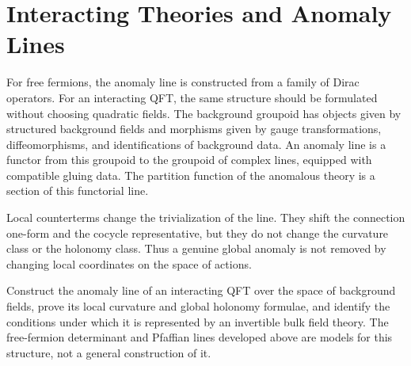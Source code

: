 \section{Interacting Theories and Anomaly Lines}

For free fermions, the anomaly line is constructed from a family of Dirac
operators.  For an interacting QFT, the same structure should be formulated
without choosing quadratic fields.  The background groupoid has objects given
by structured background fields and morphisms given by gauge transformations,
diffeomorphisms, and identifications of background data.  An anomaly line is
a functor from this groupoid to the groupoid of complex lines, equipped with
compatible gluing data.  The partition function of the anomalous theory is a
section of this functorial line.

Local counterterms change the trivialization of the line.  They shift the
connection one-form and the cocycle representative, but they do not change
the curvature class or the holonomy class.  Thus a genuine global anomaly is
not removed by changing local coordinates on the space of actions.

\begin{openproblem}
\label{op:global-anomaly-line-interacting-qft}
Construct the anomaly line of an interacting QFT over the space of background
fields, prove its local curvature and global holonomy formulae, and identify
the conditions under which it is represented by an invertible bulk field
theory.  The free-fermion determinant and Pfaffian lines developed above are
models for this structure, not a general construction of it.
\end{openproblem}
